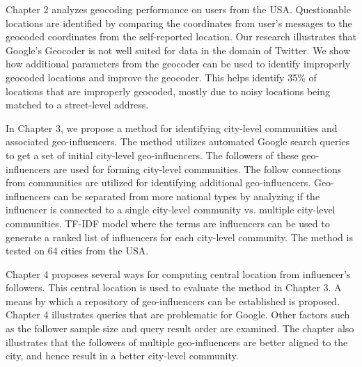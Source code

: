 Chapter 2 analyzes geocoding performance on users from the USA. Questionable locations are identified by comparing the coordinates from user's messages to the geocoded coordinates from the self-reported location. Our research illustrates that Google's Geocoder is not well suited for data in the domain of Twitter. We show how additional parameters from the geocoder can be used to identify improperly geocoded locations and improve the geocoder. This helps identify 35\% of locations that are improperly geocoded, mostly due to noisy locations being matched to a street-level address.

In Chapter 3, we propose a method for identifying city-level communities and associated geo-influencers. The method utilizes automated Google search queries to get a set of initial city-level geo-influencers. The followers of these geo-influencers are used for forming city-level communities. The follow connections from communities are utilized for identifying additional geo-influencers. Geo-influencers can be separated from more national types by analyzing if the influencer is connected to a single city-level community vs. multiple city-level communities. TF-IDF model where the terms are influencers can be used to generate a ranked list of influencers for each city-level community. The method is tested on 64 cities from the USA. %

Chapter 4 proposes several ways for computing central location from influencer's followers. This central location is used to evaluate the method in Chapter 3. A means by which a repository of geo-influencers can be established is proposed. Chapter 4 illustrates queries that are problematic for Google. %
Other factors such as the follower sample size and query result order are examined. The chapter also illustrates that the followers of multiple geo-influencers are better aligned to the city, and hence result in a better city-level community. %


